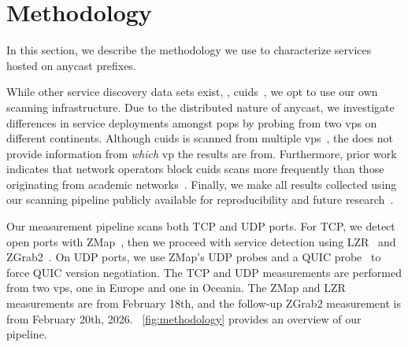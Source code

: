 \section{Methodology}\label{sec:methodology}
In this section, we describe the methodology we use to characterize services hosted on anycast prefixes.

While other service discovery data sets exist, \eg, \gls{cuids}~\cite{DurumericEtAl_CensysMapInternet_2025}, we opt to use our own scanning infrastructure. %
Due to the distributed nature of anycast, we investigate differences in service deployments amongst \glspl{pop} by probing from two \glspl{vp} on different continents.
Although \gls{cuids} is scanned from multiple \glspl{vp}~\cite{DurumericEtAl_CensysMapInternet_2025}, the \dataset does not provide information from \textit{which} \gls{vp} the results are from.
Furthermore, prior work indicates that network operators block \gls{cuids} scans more frequently than those originating from academic networks~\cite{wan-origin-scanning}.
Finally, we make all results collected using our scanning pipeline publicly available for reproducibility and future research~\cite{measurement-data}.

Our measurement pipeline scans both TCP and UDP ports.
For TCP, we detect open ports with ZMap~\cite{ZMapInternetScanner2013}, then we proceed with service detection using LZR~\cite{lzr} and ZGrab2~\cite{censys15}.
On UDP ports, we use ZMap's UDP probes and a QUIC probe~\cite{zirngibl2021over9000} to force QUIC version negotiation.
The TCP and UDP measurements are performed from two \glspl{vp}, one in Europe and one in Oceania.
The ZMap and LZR measurements are from February 18th, and the follow-up ZGrab2 measurement is from February 20th, 2026.
~\cref{fig:methodology} provides an overview of our pipeline. %

